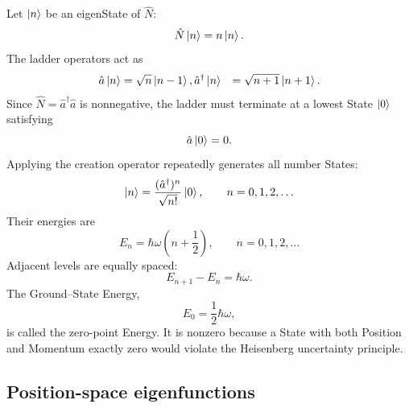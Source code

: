\documentclass[a4paper, 10pt, onepage]{elegantbook}
\begin{document}
{\noindent

Let $\ket{n}$ be an eigenState of $\hat{N}$:
\begin{equation}
  \hat{N}\ket{n}=n\ket{n}.
\end{equation}
The ladder operators act as
\begin{align}
  \hat{a}\ket{n}&=\sqrt{n}\ket{n-1},
  \hat{a}^{\dagger}\ket{n}&=\sqrt{n+1}\ket{n+1}.
\end{align}
Since $\hat{N}=\hat{a}^{\dagger}\hat{a}$ is nonnegative, the ladder
must terminate at a lowest State $\ket{0}$ satisfying
\begin{equation}
  \hat{a}\ket{0}=0.
\end{equation}
Applying the creation operator repeatedly generates all number States:
\begin{equation}
  \ket{n}=\frac{(\hat{a}^{\dagger})^n}{\sqrt{n!}}\ket{0},
  \qquad n=0,1,2,\ldots
\end{equation}
Their energies are
\begin{equation}
  E_n=\hbar\omega\left(n+\frac{1}{2}\right),
  \qquad n=0,1,2,\ldots
\end{equation}
Adjacent levels are equally spaced:
\begin{equation}
  E_{n+1}-E_n=\hbar\omega.
\end{equation}
The Ground--State Energy,
\begin{equation}
  E_0=\frac{1}{2}\hbar\omega,
\end{equation}
is called the zero-point Energy. It is nonzero because a State with
both Position and Momentum exactly zero would violate the
Heisenberg uncertainty principle.

\subsection{Position-space eigenfunctions}

\noindent

}
\end{document}
